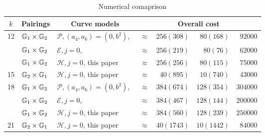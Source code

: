 
\begin{table}[h]
\centering
\caption{Numerical comaprison}

\begin{tabular}{|l|l|l | c r @{ $+$ } r @{ $\approx$ } r|}
\hline
\multicolumn{1}{|c|}{$k$}
& \multicolumn{1}{|c|}{Pairings}
& \multicolumn{1}{|c|}{Curve models}
& \multicolumn{4}{|c|}{Overall cost} \\
\hline
\multicolumn{1}{|c|}{\multirow{3}{*}{12}}
& $\mathbb{G}_{1} \times \mathbb{G}_{2}$ &$\mathcal{P},(a_4,a_6) = (0, b^2)$,~\cite{2009/craig}
& $\approx$ & $256(308)$ & $80(168)$ & $92000$ \\
& $\mathbb{G}_{1} \times \mathbb{G}_{2}$ &$\mathcal{E},j=0$,~\cite{2014/LWZ}
& $\approx$ & $256(219)$ & $80(76)$ & $62000$ \\
& $\mathbb{G}_{1} \times \mathbb{G}_{2}$ &$\mathcal{H},j=0$, this paper
& $\approx$ & $256(256)$ & $80(115)$ & $75000$ \\
\hline
15 & $\mathbb{G}_{2} \times \mathbb{G}_{1}$ &$\mathcal{H},j=0$, this paper
& $\approx$ & $40(895)$ & $10(740)$ & $43000$ \\
\hline
\multicolumn{1}{|c|}{\multirow{3}{*}{18}}
& $\mathbb{G}_{1} \times \mathbb{G}_{2}$ &$\mathcal{P},(a_4,a_6) = (0, b^2)$,~\cite{2009/craig}
& $\approx$ & $384(674)$ & $128(354)$ & $304000$ \\
& $\mathbb{G}_{1} \times \mathbb{G}_{2}$ &$\mathcal{E},j=0$,~\cite{2014/LWZ}
& $\approx$ & $384(467)$ & $128(144)$ & $200000$ \\
& $\mathbb{G}_{1} \times \mathbb{G}_{2}$ &$\mathcal{H},j=0$, this paper
& $\approx$ & $384(560)$ & $128(239)$ & $250000$ \\
\hline
21 & $\mathbb{G}_{2} \times \mathbb{G}_{1}$ &$\mathcal{H},j=0$, this paper
& $\approx$ & $40(1743)$ & $10(1442)$ & $84000$ \\
\hline
\end{tabular}
\label{tbl-numer}
\end{table}




